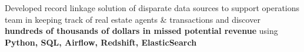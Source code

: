 \begin{cventries}
{\begin{cvitems}
          \item{Developed record linkage solution of disparate data sources to support operations team in keeping track of real estate agents \& transactions and discover \textbf{hundreds of thousands of dollars in missed potential revenue} using \textbf{Python, SQL, Airflow, Redshift, ElasticSearch}}

\end{cvitems}}
\end{cventries}
